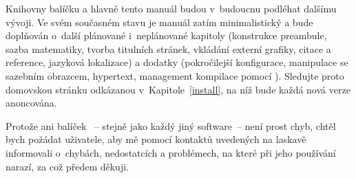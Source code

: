 Knihovny balíčku \pkg{\ipotname} a hlavně tento manuál budou v~budoucnu
podléhat dalšímu vývoji. Ve svém současném stavu je manuál zatím
minimalistický a bude doplňován o~další plánované i~neplánované kapitoly
(konstrukce preambule, sazba matematiky, tvorba titulních stránek, vkládání
externí grafiky, citace a reference, jazyková lokalizace) a dodatky
(pokročilejší konfigurace, manipulace se sazebním obrazcem, hypertext,
management kompilace pomocí ). Sledujte proto domovskou stránku
odkázanou v~Kapitole~\ref{install}, na níž bude každá nová verze anoncována.

Protože ani balíček \pkg{\ipotname}~-- stejně jako každý jiný software~-- není
prost chyb, chtěl bych požádat uživatele, aby mě pomocí kontaktů uvedených na
\authorurl{} laskavě informovali o~chybách, nedostatcích a problémech, na
které při jeho používání narazí, za což předem děkuji.

\endinput

